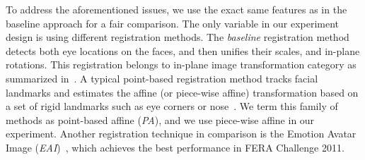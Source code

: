 \documentclass[review]{elsarticle}
\begin{document}
To address the aforementioned issues, we use the exact same features as in the baseline approach for a fair comparison. The only variable in our experiment design is using different registration methods. The \textit{baseline} registration method detects both eye locations on the faces, and then unifies their scales, and in-plane rotations. This registration belongs to in-plane image transformation category as summarized in~\cite{Yang_SMCB12}. A typical point-based registration method tracks facial landmarks and estimates the affine (or piece-wise affine) transformation based on a set of rigid landmarks such as eye corners or nose~\cite{Littlewort_CERT_FG2011,IntraFace,McDuff_TAC14}. We term this family of methods as point-based affine (\textit{PA}), and we use piece-wise affine in our experiment. Another registration technique in comparison is the Emotion Avatar Image (\textit{EAI})~\cite{Yang_SMCB12}, which achieves the best performance in FERA Challenge 2011.
\end{document}
